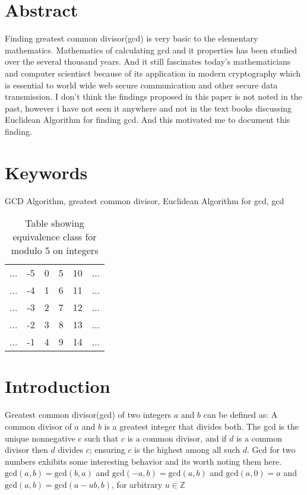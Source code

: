 \documentclass[12pt]{article}
\newcommand{\Z}{{\mathbb Z}}
\renewcommand{\gcd}{\text{gcd}}
\begin{document}
\begin{multicols}{2}
\section{Abstract}
Finding greatest common divisor(gcd) is very basic to the elementary mathematics.
Mathematics of calculating gcd and it properties has been studied over the several thousand years. And it still fascinates today's mathematicians and computer scientisct 
because of its application in modern cryptography which is essential to world wide web
secure communication and other secure data transmission.
I don't think the findings proposed in this paper is not noted in the past, however i have not seen it anywhere and not in the text books discussing Euclidean Algorithm for finding gcd. And this motivated me to document this finding. 

\section{Keywords}
GCD Algorithm, greatest common divisor, Euclidean Algorithm for gcd, gcd

\begin{table*}[t]
\centering
	\begin{tabular}{c c c c c c}
		... & -5 & 0 & 5 & 10 & ... \\
		... & -4 & 1 & 6 & 11 & ... \\
		... & -3 & 2 & 7 & 12 & ... \\
		... & -2 & 3 & 8 & 13 & ... \\
		... & -1 & 4 & 9 & 14 & ...
	\end{tabular}
\caption{Table showing equivalence class for modulo 5 on integers}
\label{table:1}
\end{table*}

\section{Introduction}
Greatest common divisor(gcd) of two integers $a$ and $b$ can be defined as: A common divisor of $a$ and $b$ is a greatest integer that divides both. The gcd is the unique	nonnegative $c$ such that $c$ is a common divisor, and if $d$ is a common divisor then $d$ divides $c$; ensuring $c$ is the highest among all such $d$. 
Gcd for two numbers exhibits some interesting behavior and its worth noting them here.
$\gcd(a,b)=\gcd(b,a)$ and $\gcd(-a,b)=\gcd(a,b)$ and $\gcd(a,0)=a$
and $\gcd(a,b)=\gcd(a-ub,b)$, for arbitrary $u\in\Z$


\end{multicols}
\end{document}
